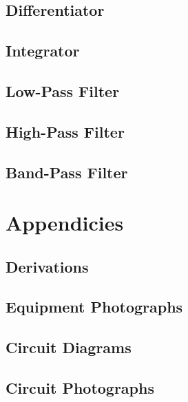 \documentclass[a4paper,10pt]{report}
\begin{document}
	\section{Differentiator}
	\section{Integrator}
	\section{Low-Pass Filter}
	\section{High-Pass Filter}
	\section{Band-Pass Filter}


\chapter{Appendicies}
	\section{Derivations}
	\section{Equipment Photographs}
	\section{Circuit Diagrams}
	\section{Circuit Photographs}
\end{document}
